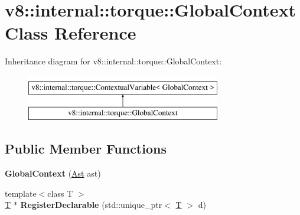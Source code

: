 \hypertarget{classv8_1_1internal_1_1torque_1_1GlobalContext}{}\section{v8\+:\+:internal\+:\+:torque\+:\+:Global\+Context Class Reference}
\label{classv8_1_1internal_1_1torque_1_1GlobalContext}
Inheritance diagram for v8\+:\+:internal\+:\+:torque\+:\+:Global\+Context\+:\begin{figure}[H]
\begin{center}
\leavevmode
\includegraphics[height=2.000000cm]{classv8_1_1internal_1_1torque_1_1GlobalContext}
\end{center}
\end{figure}
\subsection*{Public Member Functions}
\begin{DoxyCompactItemize}
\item 
\mbox{\label{classv8_1_1internal_1_1torque_1_1GlobalContext_ada0b7115a60828eca65d4f9daa730d44}} 
{\bfseries Global\+Context} (\mbox{\hyperlink{classv8_1_1internal_1_1torque_1_1Ast}{Ast}} ast)
\item 
\mbox{\label{classv8_1_1internal_1_1torque_1_1GlobalContext_ab50630249b5fb8e7be0b7ff7d1224130}} 
{\footnotesize template$<$class T $>$ }\\\mbox{\hyperlink{classv8_1_1internal_1_1torque_1_1T}{T}} $\ast$ {\bfseries Register\+Declarable} (std\+::unique\+\_\+ptr$<$ \mbox{\hyperlink{classv8_1_1internal_1_1torque_1_1T}{T}} $>$ d)
\end{DoxyCompactItemize}

